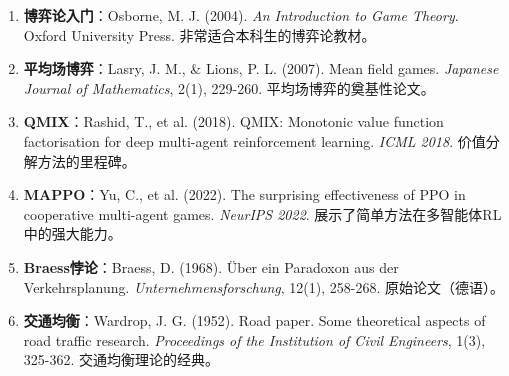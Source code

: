 \begin{enumerate}
    \item \textbf{博弈论入门}：Osborne, M. J. (2004). \textit{An Introduction to Game Theory}. Oxford University Press. 非常适合本科生的博弈论教材。

    \item \textbf{平均场博弈}：Lasry, J. M., \& Lions, P. L. (2007). Mean field games. \textit{Japanese Journal of Mathematics}, 2(1), 229-260. 平均场博弈的奠基性论文。

    \item \textbf{QMIX}：Rashid, T., et al. (2018). QMIX: Monotonic value function factorisation for deep multi-agent reinforcement learning. \textit{ICML 2018}. 价值分解方法的里程碑。

    \item \textbf{MAPPO}：Yu, C., et al. (2022). The surprising effectiveness of PPO in cooperative multi-agent games. \textit{NeurIPS 2022}. 展示了简单方法在多智能体RL中的强大能力。

    \item \textbf{Braess悖论}：Braess, D. (1968). Über ein Paradoxon aus der Verkehrsplanung. \textit{Unternehmensforschung}, 12(1), 258-268. 原始论文（德语）。

    \item \textbf{交通均衡}：Wardrop, J. G. (1952). Road paper. Some theoretical aspects of road traffic research. \textit{Proceedings of the Institution of Civil Engineers}, 1(3), 325-362. 交通均衡理论的经典。
\end{enumerate}
